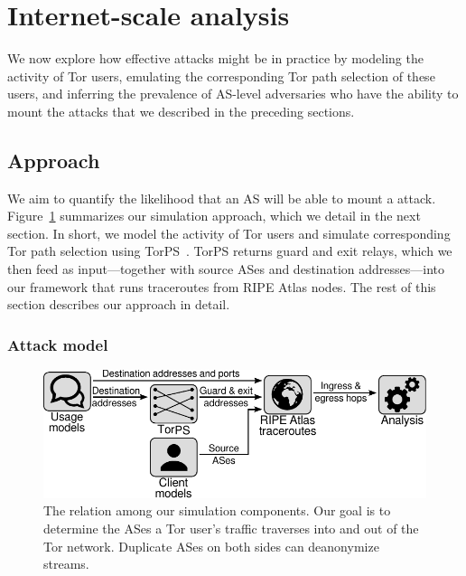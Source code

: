 \section{Internet-scale analysis}
\label{sec:internet-scale}

We now explore how effective \name attacks might be in practice by modeling
the activity of Tor users, emulating the corresponding Tor path
selection of these users, and inferring the prevalence of AS-level
adversaries who have the ability to mount the attacks that we described
in the preceding sections.

\subsection{Approach}

We aim to quantify the likelihood that an AS will be able to mount a
\name attack.  Figure~\ref{fig:simulations} summarizes our simulation approach,
which we detail in the next section. In short, we model the activity of Tor users
and simulate corresponding Tor path selection using TorPS~\cite{TorPS}.
TorPS returns guard and exit relays, which we then feed as
input---together with source ASes and destination addresses---into our
framework that runs traceroutes from RIPE Atlas nodes.  The rest of this
section describes our approach in detail.

\subsubsection{Attack model}

\begin{figure}[t]
	\centering
	\includegraphics[width=\linewidth]{figures/simulations.pdf}
	\caption{The relation among our simulation components.  Our goal is to
	determine the ASes a Tor user's traffic traverses into and out of the Tor
	network.  Duplicate ASes on both sides can deanonymize streams.}
	\label{fig:simulations}
\end{figure}


